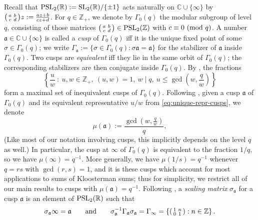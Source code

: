 \documentclass[reqno,11pt]{amsart}
\theoremstyle{remark}
\numberwithin{equation}{section}
\newcommand{\Z}{\mathbb{Z}}
\newcommand{\R}{\mathbb{R}}
\newcommand{\C}{\mathbb{C}}
\newcommand{\ma}{\mathfrak{a}}
\newcommand{\SL}{\textnormal{SL}}
\newcommand{\PSL}{\textnormal{PSL}}
\renewcommand{\pmod}[1]{\ (\textnormal{mod } #1)}
\newenvironment{psmall}
  {\left(\begin{smallmatrix}}
  {\end{smallmatrix}\right)}
\begin{document}
Recall that $\PSL_2(\R) := \SL_2(\R)/\{\pm 1\}$ acts naturally on $\C \cup \{\infty\}$ by $\begin{psmall} a & b \\ c & d \end{psmall} z := \frac{az+b}{cz+d}$.
For $q \in \Z_+$, we denote by $\Gamma_0(q)$ the modular subgroup of level $q$, consisting of those matrices $\begin{psmall} a & b \\ c & d \end{psmall} \in \PSL_2(\Z)$ with $c \equiv 0 \pmod{q}$. A number $\ma \in \C \cup \{\infty\}$ is called a \emph{cusp} of $\Gamma_0(q)$ iff it is the unique fixed point of some $\sigma \in \Gamma_0(q)$; we write $\Gamma_{\ma} := \{ \sigma \in \Gamma_0(q) : \sigma \ma = \ma\}$ for the stabilizer of $\ma$ inside $\Gamma_0(q)$. Two cusps are \emph{equivalent} iff they lie in the same orbit of $\Gamma_0(q)$; the corresponding stabilizers are then conjugate inside $\Gamma_0(q)$. By \cite[Lemma 2.3]{deshouillers1982kloosterman}, the fractions
\begin{equation} \label{eq:unique-repr-cusps}
    \left\{\frac{u}{w}\ : \ u, w \in \Z_+,\ (u, w) = 1,\ w \mid q,\ u \le \gcd\left(w, \frac{q}{w}\right) \right\}
\end{equation}
form a maximal set of inequivalent cusps of $\Gamma_0(q)$. Following \cite[(1.1)]{deshouillers1982kloosterman}, given a cusp $\ma$ of $\Gamma_0(q)$ and its equivalent representative $u/w$ from \cref{eq:unique-repr-cusps}, we denote
\begin{equation} \label{eq:mu}
    \mu(\ma) := \frac{\gcd\left(w, \frac{q}{w}\right)}{q},
\end{equation}
(Like most of our notation involving cusps, this implicitly depends on the level $q$ as well.)
In particular, the cusp at $\infty$ of $\Gamma_0(q)$ is equivalent to the fraction $1/q$, so we have $\mu(\infty) = q^{-1}$. More generally, we have $\mu(1/s) = q^{-1}$ whenever $q = rs$ with $\gcd(r, s) = 1$, and it is these cusps which account for most applications to sums of Kloosterman sums; thus for simplicity, we restrict all of our main results to cusps with $\mu(\ma) = q^{-1}$. Following \cite[(1.2)]{deshouillers1982kloosterman}, a \emph{scaling matrix} $\sigma_{\ma}$ for a cusp $\ma$ is an element of $\PSL_2(\R)$ such that
\begin{equation} \label{eq:scaling-matrices}
    \sigma_\ma \infty = \ma 
    \qquad \text{and} \qquad 
    \sigma_{\ma}^{-1} \Gamma_\ma \sigma_\ma = \Gamma_\infty = \left\{\begin{psmall} 1 & n \\ 0 & 1 \end{psmall} : n \in \Z \right\}.
\end{equation}
\end{document}
